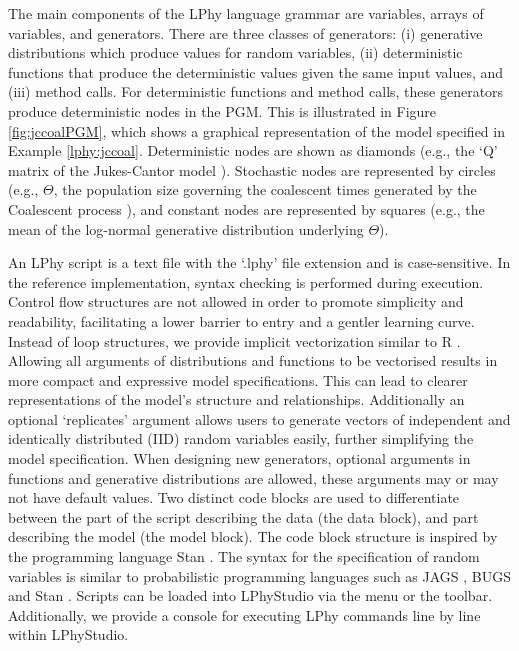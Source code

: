 \documentclass[10pt,letterpaper,table]{article}
\theoremstyle{definition}
\begin{document}
The main components of the LPhy language grammar are variables, arrays of variables, and generators. 
There are three classes of generators: (i) generative distributions which produce values for random variables, (ii) deterministic functions that produce the deterministic values given the same input values, and (iii) method calls.
For deterministic functions and method calls, these generators produce deterministic nodes in the PGM.
This is illustrated in Figure \ref{fig:jccoalPGM}, which shows a graphical representation of the model specified in Example \ref{lphy:jccoal}.
Deterministic nodes are shown as diamonds (e.g., the `Q' matrix of the Jukes-Cantor model \cite{jc69}).
Stochastic nodes are represented by circles (e.g., $\Theta$, the population size governing the coalescent times generated by the Coalescent process \cite{kingman82}), and constant nodes are represented by squares (e.g., the mean of the log-normal generative distribution underlying $\Theta$). 

An LPhy script is a text file with the `.lphy' file extension and is case-sensitive. 
In the reference implementation, syntax checking is performed during execution. 
Control flow structures are not allowed in order to promote simplicity and readability, facilitating a lower barrier to entry and a gentler learning curve. 
Instead of loop structures, we provide implicit vectorization similar to R \cite{ihaka1996r}. Allowing all arguments of distributions and functions to be vectorised results in more compact and expressive model specifications. 
This can lead to clearer representations of the model's structure and relationships. Additionally an optional `replicates' argument allows users to generate vectors of independent and identically distributed (IID) random variables easily, further simplifying the model specification.
When designing new generators, optional arguments in functions and generative distributions are allowed, these arguments may or may not have default values. 
Two distinct code blocks are used to differentiate between the part of the script describing the data (the data block), and part describing the model (the model block). 
The code block structure is inspired by the programming language Stan \cite{carpenter2017stan}. 
The syntax for the specification of random variables is similar to probabilistic programming languages such as JAGS \cite{plummer2004jags}, BUGS \cite{lunn2009bugs, gilks1994language} and Stan \cite{carpenter2017stan}.
Scripts can be loaded into LPhyStudio via the menu or the toolbar. 
Additionally, we provide a console for executing LPhy commands line by line within LPhyStudio. 
\end{document}

